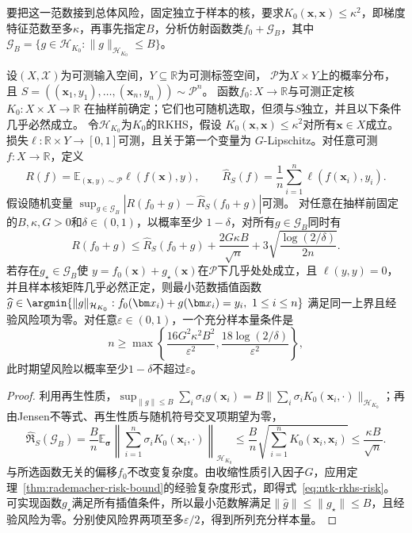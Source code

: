 要把这一范数接到总体风险，固定独立于样本的核，要求$K_0(\bm x,\bm x)\leq\kappa^2$，即梯度特征范数至多$\kappa$，再事先指定$B$，分析仿射函数类$f_0+\mathcal G_B$，其中$\mathcal G_B=\{g\in\mathcal H_{K_0}:\|g\|_{\mathcal H_{K_0}}\leq B\}$。

\begin{theorem}[初始梯度特征的期望风险界]
\label{thm:ntk-rkhs-risk}
设$(X,\mathcal X)$为可测输入空间，$Y\subseteq\mathbb R$为可测标签空间，
$\mathcal P$为$X\times Y$上的概率分布，且
$S=((\bm x_1,y_1),\ldots,(\bm x_n,y_n))\sim\mathcal P^n$。
函数$f_0:X\to\mathbb R$与可测正定核$K_0:X\times X\to\mathbb R$
在抽样前确定；它们也可随机选取，但须与$S$独立，并且以下条件几乎必然成立。
令$\mathcal H_{K_0}$为$K_0$的RKHS，假设
$K_0(\bm x,\bm x)\leq\kappa^2$对所有$\bm x\in X$成立。
损失$\ell:\mathbb R\times Y\to[0,1]$可测，且关于第一个变量为
$G$-Lipschitz。对任意可测$f:X\to\mathbb R$，定义
\[
 R(f)=\mathbb E_{(\bm x,y)\sim\mathcal P}\ell(f(\bm x),y),\qquad
 \hat R_S(f)=\frac1n\sum_{i=1}^n\ell(f(\bm x_i),y_i).
\]
假设随机变量
$\sup_{g\in\mathcal G_B}|R(f_0+g)-\hat R_S(f_0+g)|$可测。
对任意在抽样前固定的$B,\kappa,G>0$和$\delta\in(0,1)$，以概率至少
$1-\delta$，对所有$g\in\mathcal G_B$同时有
\begin{equation}
 R(f_0+g)\leq\hat R_S(f_0+g)
       +\frac{2G\kappa B}{\sqrt n}
       +3\sqrt{\frac{\log(2/\delta)}{2n}}.
 \label{eq:ntk-rkhs-risk}
\end{equation}
若存在$g_\star\in\mathcal G_B$使
$y=f_0(\bm x)+g_\star(\bm x)$在$\mathcal P$下几乎处处成立，且
$\ell(y,y)=0$，并且样本核矩阵几乎必然正定，则最小范数插值函数
$\widehat g\in\argmin\{\|g\|_{\mathcal H_{K_0}}:f_0(\bm x_i)+g(\bm x_i)=y_i,\ 1\leq i\leq n\}$
满足同一上界且经验风险项为零。对任意$\varepsilon\in(0,1)$，一个充分样本量条件是
\[
 n\geq\max\left\{\frac{16G^2\kappa^2B^2}{\varepsilon^2},
                  \frac{18\log(2/\delta)}{\varepsilon^2}\right\},
\]
此时期望风险以概率至少$1-\delta$不超过$\varepsilon$。
\end{theorem}
\begin{proof}
利用再生性质，$\sup_{\|g\|\leq B}\sum_i\sigma_ig(\bm x_i)=B\|\sum_i\sigma_iK_0(\bm x_i,\cdot)\|_{\mathcal H_{K_0}}$；再由Jensen不等式、再生性质与随机符号交叉项期望为零，
\[
 \widehat{\mathfrak R}_S(\mathcal G_B)
 =\frac Bn\mathbb E_{\bm\sigma}
       \left\|\sum_{i=1}^n\sigma_i K_0(\bm x_i,\cdot)\right\|_{\mathcal H_{K_0}}
 \leq\frac Bn\sqrt{\sum_{i=1}^nK_0(\bm x_i,\bm x_i)}
 \leq\frac{\kappa B}{\sqrt n}.
\]
与所选函数无关的偏移$f_0$不改变复杂度。由收缩性质引入因子$G$，应用定理~\ref{thm:rademacher-risk-bound}的经验复杂度形式，即得式~\eqref{eq:ntk-rkhs-risk}。可实现函数$g_\star$满足所有插值条件，所以最小范数解满足$\|\widehat g\|\leq\|g_\star\|\leq B$，且经验风险为零。分别使风险界两项至多$\varepsilon/2$，得到所列充分样本量。
\end{proof}

